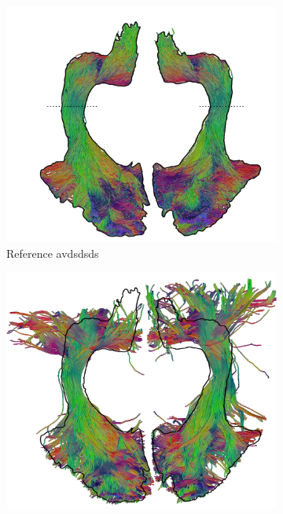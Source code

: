 \begin{figure}
	\centering
	\begin{minipage}{0.24\linewidth}
\begin{subfigure}[b]{\linewidth}
		\includegraphics[width=\linewidth]{or-ref-c}
		\caption{Reference {\color{white} avdsdsds} }
	\end{subfigure}
\end{minipage}
\hfil
	\begin{minipage}{0.24\linewidth}
		\begin{subfigure}[b]{\linewidth}
		\includegraphics[width=\linewidth]{or-rank-c}

\end{subfigure}
\end{minipage}
\end{figure}
